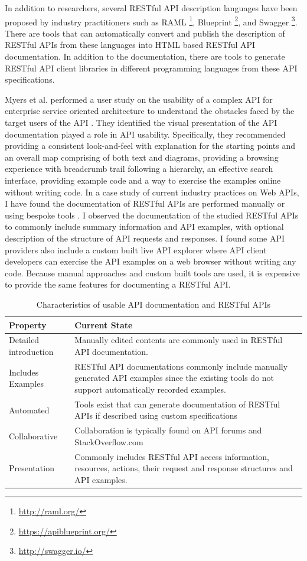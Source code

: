 \documentclass[11pt,oneside]{book}
\begin{document}
In addition to researchers, several RESTful API description languages have been proposed by industry practitioners such as RAML \footnote{\url{http://raml.org/}}, Blueprint \footnote{\url{https://apiblueprint.org/}}, and Swagger \footnote{\url{http://swagger.io/}}. There are tools that can automatically convert and publish the description of RESTful APIs from these languages into HTML based RESTful API documentation. In addition to the documentation, there are tools to generate RESTful API client libraries in different programming languages from these API specifications.

Myers et al. performed a user study on the usability of a complex API for enterprise service oriented architecture to understand the obstacles faced by the target users of the API \cite{Myers_study}. They identified the visual presentation of the API documentation played a role in API usability. Specifically, they recommended providing a consistent look-and-feel with explanation for the starting points and an overall map comprising of both text and diagrams, providing a browsing experience with breadcrumb trail following a hierarchy, an effective search interface, providing example code and a way to exercise the examples online without writing code. In a case study of current industry practices on Web APIs, I have found the documentation of RESTful APIs are performed manually or using bespoke tools \cite{sohan2015case}. I observed the documentation of the studied RESTful APIs to commonly include summary information and API examples, with optional description of the structure of API requests and responses. I found some API providers also include a custom built live API explorer where API client developers can exercise the API examples on a web browser without writing any code. Because manual approaches and custom built tools are used, it is expensive to provide the same features for documenting a RESTful API.

\begin{table}[!tbh]
  \caption{Characteristics of usable API documentation and RESTful APIs}
  \label{table:restful_apis}
\begin{tabular}{|p{1.5in} | p{3in}|}
\hline
Property & Current State \\
\hline
Detailed introduction &
Manually edited contents are commonly used in RESTful API documentation.
 \\
\hline
Includes Examples &
RESTful API documentations commonly include manually generated API examples since the existing tools do not support automatically recorded examples.
 \\
\hline
Automated &
Tools exist that can generate documentation of RESTful APIs if described using custom specifications \\
\hline
Collaborative &
Collaboration is typically found on API forums and StackOverflow.com \\
\hline
Presentation &
Commonly includes RESTful API access information, resources, actions, their request and response structures and API examples.\\
\hline
\end{tabular}
\end{table}
\end{document}
